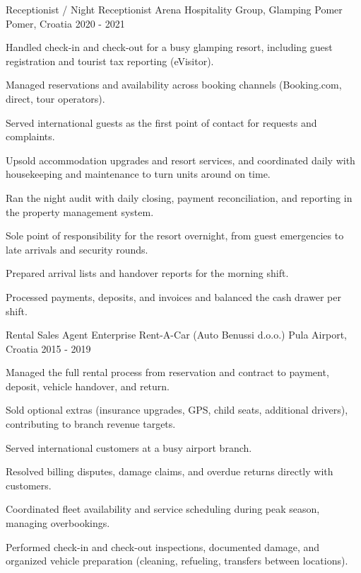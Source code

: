 \begin{cventries}
  \cventry
    {Receptionist / Night Receptionist} %
    {Arena Hospitality Group, Glamping Pomer} %
    {Pomer, Croatia} %
    {2020 - 2021} %
    {
      \begin{cvitems} %
        \item {Handled check-in and check-out for a busy glamping resort, including guest registration and tourist tax reporting (eVisitor).}
        \item {Managed reservations and availability across booking channels (Booking.com, direct, tour operators).}
        \item {Served international guests as the first point of contact for requests and complaints.}
        \item {Upsold accommodation upgrades and resort services, and coordinated daily with housekeeping and maintenance to turn units around on time.}
        \item {Ran the night audit with daily closing, payment reconciliation, and reporting in the property management system.}
        \item {Sole point of responsibility for the resort overnight, from guest emergencies to late arrivals and security rounds.}
        \item {Prepared arrival lists and handover reports for the morning shift.}
        \item {Processed payments, deposits, and invoices and balanced the cash drawer per shift.}
      \end{cvitems}
    }

  \cventry
    {Rental Sales Agent} %
    {Enterprise Rent-A-Car (Auto Benussi d.o.o.)} %
    {Pula Airport, Croatia} %
    {2015 - 2019} %
    {
      \begin{cvitems} %
        \item {Managed the full rental process from reservation and contract to payment, deposit, vehicle handover, and return.}
        \item {Sold optional extras (insurance upgrades, GPS, child seats, additional drivers), contributing to branch revenue targets.}
        \item {Served international customers at a busy airport branch.}
        \item {Resolved billing disputes, damage claims, and overdue returns directly with customers.}
        \item {Coordinated fleet availability and service scheduling during peak season, managing overbookings.}
        \item {Performed check-in and check-out inspections, documented damage, and organized vehicle preparation (cleaning, refueling, transfers between locations).}
      \end{cvitems}
    }


\end{cventries}
